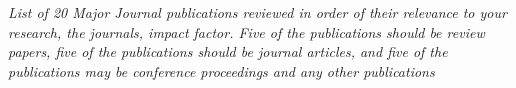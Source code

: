 

\textit{List of 20 Major Journal publications reviewed in order of their relevance to your research, the journals, impact factor. Five of the publications should be review papers, five of the publications should be journal articles, and five of the publications may be conference proceedings and any other publications}